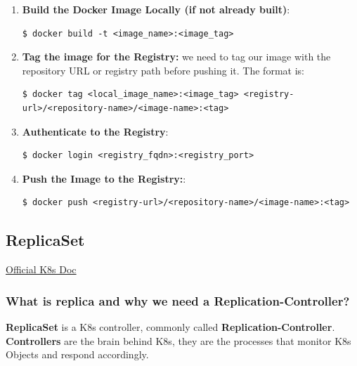 \documentclass{article}
\newenvironment{codetemplate}[1][]{%
  \mybasecolorbox[#1]
  \itshape
}{%
  \endmybasecolorbox
}
\begin{document}
\begin{enumerate}
    \item \textbf{Build the Docker Image Locally (if not already built)}:
\begin{codetemplate}{}
\begin{verbatim}
$ docker build -t <image_name>:<image_tag>
\end{verbatim}
\end{codetemplate}

    \item \textbf{Tag the image for the Registry:}  we need to tag our image with the repository URL or registry path before pushing it. The format is:
\begin{codetemplate}{}
\begin{verbatim}
$ docker tag <local_image_name>:<image_tag> <registry-url>/<repository-name>/<image-name>:<tag>
\end{verbatim}
\end{codetemplate}

    \item \textbf{Authenticate to the Registry}:
\begin{codetemplate}{}
\begin{verbatim}
$ docker login <registry_fqdn>:<registry_port>
\end{verbatim}
\end{codetemplate}

    \item \textbf{Push the Image to the Registry:}:
\begin{codetemplate}{}
\begin{verbatim}
$ docker push <registry-url>/<repository-name>/<image-name>:<tag>
\end{verbatim}
\end{codetemplate}
\end{enumerate}

\subsection{ReplicaSet}
\href{https://kubernetes.io/docs/concepts/workloads/controllers/replicaset/}{Official K8s Doc}

\subsubsection{What is replica and why we need a Replication-Controller?}

\textbf{ReplicaSet} is a K8s controller, commonly called \textbf{Replication-Controller}. \textbf{Controllers} are the brain behind K8s, they are the processes that monitor K8s Objects and respond accordingly.
\end{document}
